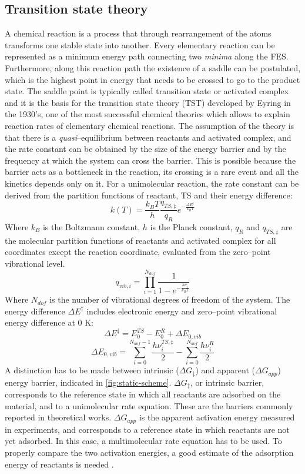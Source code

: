 \subsection*{Transition state theory}
A chemical reaction is a process that through rearrangement of the atoms transforms one stable state into another. Every elementary reaction can be represented as a minimum energy path connecting two \textit{minima} along the FES. Furthermore, along this reaction path the existence of a saddle can be postulated, which is the highest point in energy that needs to be crossed to go to the product state. 
The saddle point is typically called transition state or activated complex and it is the basis for the transition state theory (TST) developed by Eyring in the 1930’s, one of the most successful chemical theories which allows to explain reaction rates of elementary chemical reactions. The assumption of the theory is that there is a \textit{quasi}--equilibrium between reactants and activated complex, and the rate constant can be obtained by the size of the energy barrier and by the frequency at which the system can cross the barrier. This is possible because the barrier acts as a bottleneck in the reaction, its crossing is a rare event and all the kinetics depends only on it. For a unimolecular reaction, the rate constant can be derived from the partition functions of reactant, TS and their energy difference:
\[
k(T) = \dfrac{{k_B T}}{h}
\dfrac{{q_{TS,\ddagger}}}{{q_R}} e^{- \frac{\Delta E^{\ddagger}}{k_B T}}
\]
Where $k_B$ is the Boltzmann constant, $h$ is the Planck constant, $q_R$ and $q_{TS,\ddagger}$ are the molecular partition functions of reactants and activated complex for all coordinates except the reaction coordinate, evaluated from the zero--point vibrational level. 
\[
q_{vib,i} = \prod_{i=1}^{N_{dof}} \dfrac{1}{1 - e^{- \frac{h \nu_{i}}{k_B T}}}
\]
Where $N_{dof}$ is the number of vibrational degrees of freedom of the system. The energy difference $\Delta E^{\ddagger}$ includes electronic energy and zero--point vibrational energy difference at 0 K:
\[
\Delta E^{\ddagger} = E_{0}^{TS} - E_{0}^{R} + \Delta E_{0,vib}
\]
\[
\Delta E_{0,vib} = \sum_{i=0}^{N_{dof}-1} \frac{h \nu_{i}^{TS,\ddagger}}{2}
- \sum_{i=0}^{N_{dof}} \frac{h \nu_{i}^{R}}{2}
\]
A distinction has to be made between intrinsic ($\Delta G_{\ddagger}$) and apparent ($\Delta G_{app}$) energy barrier, indicated in \ref{fig:static-scheme}. $\Delta G_{\ddagger}$, or intrinsic barrier, corresponds to the reference state in which all reactants are adsorbed on the material, and to a unimolecular rate equation. These are the barriers commonly reported in theoretical works. $\Delta G_{app}$ is the apparent activation energy measured in experiments, and corresponds to a reference state in which reactants are not yet adsorbed. In this case, a multimolecular rate equation has to be used. To properly compare the two activation energies, a good estimate of the adsorption energy of reactants is needed \cite{vanspeybroeck2014first}.

